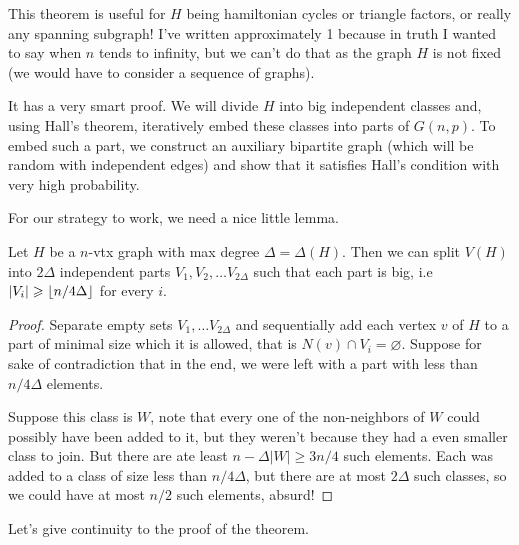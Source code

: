 \begin{remark}
	This theorem is useful for $H$ being hamiltonian cycles or triangle
	factors, or really any spanning subgraph! I've written
	approximately 1 because in truth I wanted to say when $n$ tends to
	infinity, but we can't do that as the graph $H$ is not fixed (we would have
	to consider a sequence of graphs).
\end{remark}

It has a very smart proof. We will divide $H$ into big independent
classes and, using Hall's theorem, iteratively embed
these classes into parts of $G(n,p)$. To embed such a part, we
construct an auxiliary bipartite graph (which will be random with
independent edges) and show that it satisfies Hall's condition with
very high probability.

For our strategy to work, we need a nice little lemma.
\begin{lemma}
	Let $H$ be a $n$-vtx graph with max degree $\Delta = \Delta(H)$.
	Then we can split $V(H)$ into $2\Delta$ independent
	parts $V_1,V_2, \dots V_{2\Delta}$ such that each part is big, i.e
	$|V_i| \geqslant \lfloor n/4\Delta \rfloor$ for every $i$.
\end{lemma}

\begin{proof}
	Separate empty sets $V_1, \dots V_{2\Delta}$ and sequentially add
	each vertex $v$ of $H$
	to a part of minimal size which it is allowed, that is $N(v) \cap
	V_i = \varnothing$. Suppose for sake
	of contradiction that in the end, we were left with a part with less
	than $n/4\Delta$ elements.

	Suppose this class is $W$, note that every one of the non-neighbors
	of $W$ could possibly have been
	added to it, but they weren't because they had a even smaller class
	to join. But there are ate least
	$n - \Delta |W| \geq 3n/4$ such elements. Each was added to a class
	of size less than $n/4\Delta$,
	but there are at most $2\Delta$ such classes, so we could have at
	most $n/2$ such elements, absurd!
\end{proof}

Let's give continuity to the proof of the theorem.


